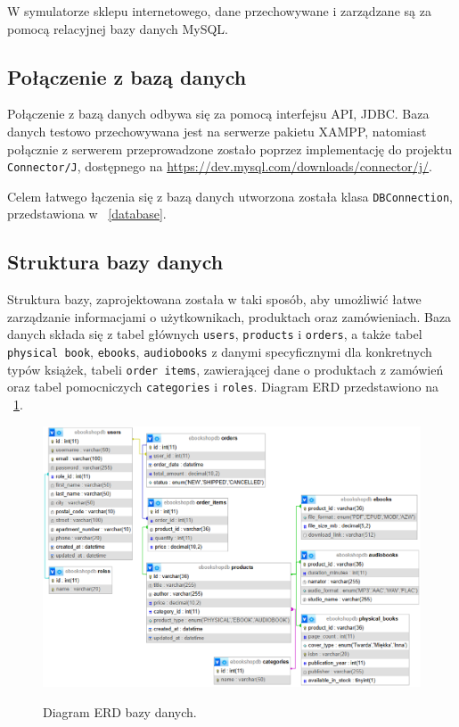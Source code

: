 
W symulatorze sklepu internetowego, dane przechowywane i zarządzane są za pomocą relacyjnej bazy danych MySQL.

\subsection{Połączenie z bazą danych}

Połączenie z bazą danych odbywa się za pomocą interfejsu API, JDBC. Baza danych testowo przechowywana jest na serwerze pakietu XAMPP, natomiast połącznie z serwerem przeprowadzone zostało poprzez
implementację do projektu \texttt{Connector/J}, dostępnego na \url{https://dev.mysql.com/downloads/connector/j/}.

Celem łatwego łączenia się z bazą danych utworzona została klasa \texttt{DBConnection}, przedstawiona w \listingname~\ref{database}.



\subsection{Struktura bazy danych}

Struktura bazy, zaprojektowana została w taki sposób, aby umożliwić łatwe zarządzanie informacjami o użytkownikach, produktach oraz zamówieniach.
Baza danych składa się z tabel głównych \texttt{users}, \texttt{products} i \texttt{orders}, a także tabel \texttt{physical book}, \texttt{ebooks}, \texttt{audiobooks} z danymi specyficznymi dla 
konkretnych typów książek, tabeli \texttt{order items}, zawierającej dane o produktach z zamówień oraz tabel pomocniczych \texttt{categories} i \texttt{roles}. Diagram ERD przedstawiono na \figurename~\ref{fig4}.

\begin{figure}[H]
    \centering
    \includegraphics[width=\linewidth]{figures/fig_0004.eps}\\
    \caption{Diagram ERD bazy danych.\label{fig4}}
\end{figure}

